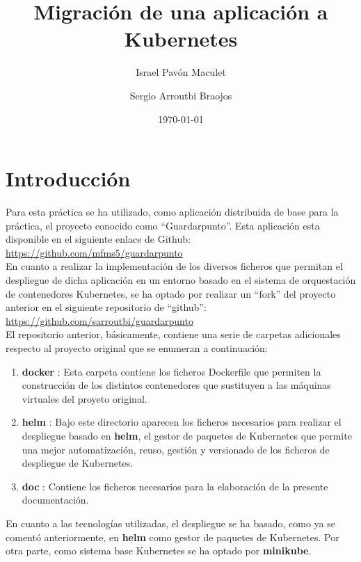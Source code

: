 \documentclass[12pt,spanish]{article}
\title{\textbf{Migración de una aplicación a Kubernetes}}
\author{Israel Pavón Maculet\\
  \and
  Sergio Arroutbi Braojos}
\date{\today}
\begin{document}
\maketitle
\hypersetup{linkcolor=black,urlcolor=blue}
\tableofcontents

\listoffigures

\pagebreak
\section{Introducción}

Para esta práctica se ha utilizado, como aplicación distribuida de base para la práctica, el proyecto conocido como ``Guardarpunto''. Esta aplicación esta disponible en el siguiente enlace de Github:\\

\url{https://github.com/mfms5/guardarpunto}\\

En cuanto a realizar la implementación de los diversos ficheros que permitan el despliegue de dicha aplicación en un entorno basado en el sistema de orquestación de contenedores Kubernetes, se ha optado por realizar un ``fork'' del proyecto anterior en el siguiente repositorio de ``github'':\\

\url{https://github.com/sarroutbi/guardarpunto}\\

El repositorio anterior, básicamente, contiene una serie de carpetas adicionales respecto al proyecto original que se enumeran a continuación:

\begin{enumerate}
\item{\textbf{docker} :} Esta carpeta contiene los ficheros Dockerfile que permiten la construcción de los distintos contenedores que sustituyen a las máquinas virtuales del proyeto original.
\item{\textbf{helm} :} Bajo este directorio aparecen los ficheros necesarios para realizar el despliegue basado en \textbf{helm}, el gestor de paquetes de Kubernetes que permite una mejor automatización, reuso, gestión y versionado de los ficheros de despliegue de Kubernetes.
\item{\textbf{doc} :} Contiene los ficheros necesarios para la elaboración de la presente documentación.
\end{enumerate}

En cuanto a las tecnologías utilizadas, el despliegue se ha basado, como ya se comentó anteriormente, en \textbf{helm} como gestor de paquetes de Kubernetes. Por otra parte, como sistema base Kubernetes se ha optado por \textbf{minikube}.\\
\end{document}
